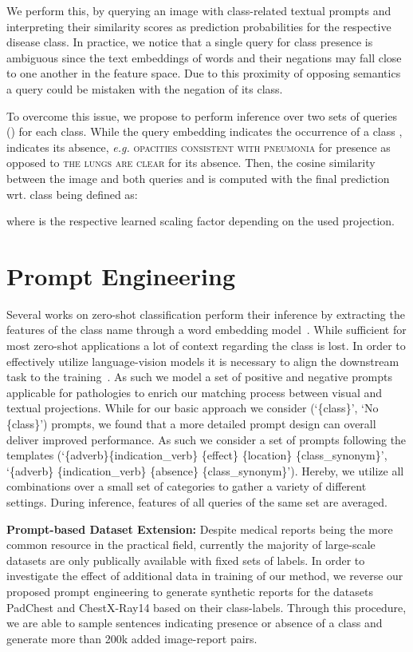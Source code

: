 \documentclass[runningheads]{llncs}
\begin{document}
We perform this, by querying an image with class-related textual prompts and interpreting their similarity scores as prediction probabilities for the respective disease class. In practice, we notice that a single query for class presence is ambiguous since the text embeddings of words and their negations may fall close to one another in the feature space. Due to this proximity of opposing semantics a query could be mistaken with the negation of its class. 

To overcome this issue, we propose to perform inference over two sets of queries () for each class. While the query embedding   indicates the occurrence of a class ,  indicates its absence, \textit{e.g.} \textsc{opacities consistent with pneumonia} for presence as opposed to \textsc{the lungs are clear} for its absence.
Then, the cosine similarity between the image and both queries  and  is computed with the final prediction wrt. class  being defined as:

where  is the respective learned scaling factor depending on the used projection.

\section{Prompt Engineering}
Several works on zero-shot classification perform their inference by extracting the features of the class name through a word embedding model~\cite{wang2019survey}. While sufficient for most zero-shot applications a lot of context regarding the class is lost.  In order to effectively utilize language-vision models it is necessary to align the downstream task to the training~\cite{radford2021learning}. 
As such we model a set of positive and negative prompts applicable for pathologies to enrich our matching process between visual and textual projections.
While for our basic approach we consider (`\{class\}', `No \{class\}') prompts, we found that a more detailed prompt design can overall deliver improved performance.  As such we consider a set of prompts following the templates (`\{adverb\}\{indication\_verb\} \{effect\} \{location\} \{class\_synonym\}', `\{adverb\} \{indication\_verb\} \{absence\} \{class\_synonym\}'). Hereby, we utilize all combinations over a small set of categories to gather a variety of different settings. During inference, features of all queries of the same set are averaged.  

\noindent\textbf{Prompt-based Dataset Extension: } Despite medical reports being the more common resource in the practical field, currently the majority of large-scale datasets are only publically available with fixed sets of labels. In order to investigate the effect of additional data in training of our method, we reverse our proposed prompt engineering to generate synthetic reports for the datasets PadChest and ChestX-Ray14 based on their class-labels.
Through this procedure, we are able to sample sentences indicating presence or absence of a class and generate more than 200k added image-report pairs.
\end{document}
